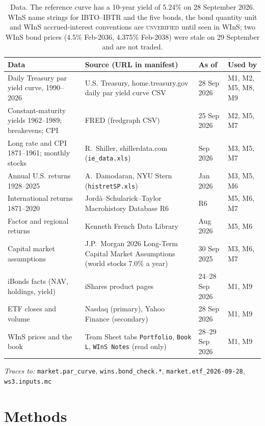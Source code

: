 \documentclass[11pt,a4paper]{article}
\newcommand{\nk}[1]{{\urlstyle{tt}\nolinkurl{#1}}}
\newcommand{\keys}[1]{\par{\footnotesize\raggedright\color{black!60}\textit{Traces to:} #1\par}}
\newcommand{\UNV}{\textsc{unverified}}
\begin{document}
\begin{table}[h]
\centering\small
\begin{tabularx}{\textwidth}{>{\raggedright}p{3.9cm}>{\raggedright}Xp{2.2cm}l}
\toprule
Data & Source (URL in manifest) & As of & Used by \\
\midrule
Daily Treasury par yield curve, 1990--2026 & U.S. Treasury, home.treasury.gov daily par yield curve CSV & 28 Sep 2026 & M1, M2, M5, M8, M9 \\
Constant-maturity yields 1962--1989; breakevens; CPI & FRED (fredgraph CSV) & 25 Sep 2026 & M2, M5, M7 \\
Long rate and CPI 1871--1961; monthly stocks & R.~Shiller, shillerdata.com (\texttt{ie\_data.xls}) & Sep 2026 & M3, M5, M7 \\
Annual U.S. returns 1928--2025 & A.~Damodaran, NYU Stern (\texttt{histretSP.xls}) & Jan 2026 & M3, M5, M6 \\
International returns 1871--2020 & Jord\`a--Schularick--Taylor Macrohistory Database R6 & R6 & M5, M6, M7 \\
Factor and regional returns & Kenneth French Data Library & Aug 2026 & M5, M6 \\
Capital market assumptions & J.P.~Morgan 2026 Long-Term Capital Market Assumptions (world stocks 7.0\% a year) & 30 Sep 2025 & M3, M6, M7 \\
iBonds facts (NAV, holdings, yield) & iShares product pages & 24--28 Sep 2026 & M1, M9 \\
ETF closes and volume & Nasdaq (primary), Yahoo Finance (secondary) & 28 Sep 2026 & M1, M9 \\
WInS prices and the book & Team Sheet tabs \texttt{Portfolio}, \texttt{Book L}, \texttt{WInS Notes} (read only) & 28--29 Sep 2026 & M1, M9 \\
\bottomrule
\end{tabularx}
\caption{Data. The reference curve has a 10-year yield of 5.24\% on 28 September 2026. WInS name strings for
IBTO--IBTR and the five bonds, the bond quantity unit and WInS accrued-interest conventions are \UNV{} until seen
in WInS; two WInS bond prices (4.5\% Feb-2036, 4.375\% Feb-2038) were stale on 29 September and are not traded.}
\label{tab:data}
\end{table}
\keys{\nk{market.par_curve}, \nk{wins.bond_check.*}, \nk{market.etf_2026-09-28}, \nk{ws3.inputs.mc}}

\section{Methods}\label{sec:methods}
\end{document}
